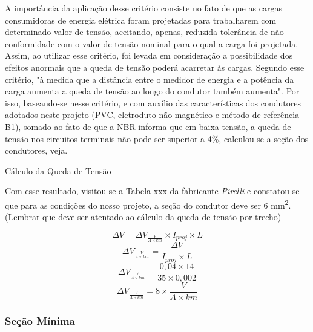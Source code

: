 A importância da aplicação desse critério consiste no fato de que as cargas consumidoras de energia elétrica foram projetadas para trabalharem com determinado valor de tensão, aceitando, apenas, reduzida tolerância de não-conformidade com o valor de tensão nominal para o qual a carga foi projetada.
Assim, ao utilizar esse critério, foi levada em consideração a possibilidade dos efeitos anormais que a queda de tensão poderá acarretar às cargas.
 Segundo esse critério, "à medida que a distância entre o medidor de energia e a potência da carga aumenta a queda de tensão ao longo do condutor também aumenta". 
Por isso, baseando-se nesse critério, e com auxílio das características dos condutores adotados neste projeto (PVC, eletroduto não magnético e método de referência B1), somado ao fato de que a NBR informa que em baixa tensão, a queda de tensão nos circuitos terminais não pode ser superior a 4\%, calculou-se a seção dos condutores, veja.

\begin{description}

	\item Cálculo da Queda de Tensão
	
	Com esse resultado, visitou-se a Tabela xxx da fabricante \textit{Pirelli} e constatou-se que para as condições do nosso projeto, a seção do condutor deve ser 6 mm\textsuperscript{2}.
(Lembrar que deve ser atentado ao cálculo da queda de tensão por trecho)

\begin{equation}
	\Delta V = \Delta V_{\frac{V}{A \times km}} \times I_{proj} \times L
\end{equation}
\begin{equation}
	\Delta V_{\frac{V}{A \times km}} = \frac{\Delta V} {I_{proj} \times L}
\end{equation}
\begin{equation}
	\Delta V_{\frac{V}{A \times km}} = \frac{0,04 \times 14}{35 \times 0,002}
\end{equation}
\begin{equation}
	\Delta V_{\frac{V}{A \times km}} = 8 \times \frac{V}{A \times km}
\end{equation}

\end{description}

\subsubsection{Seção Mínima}

